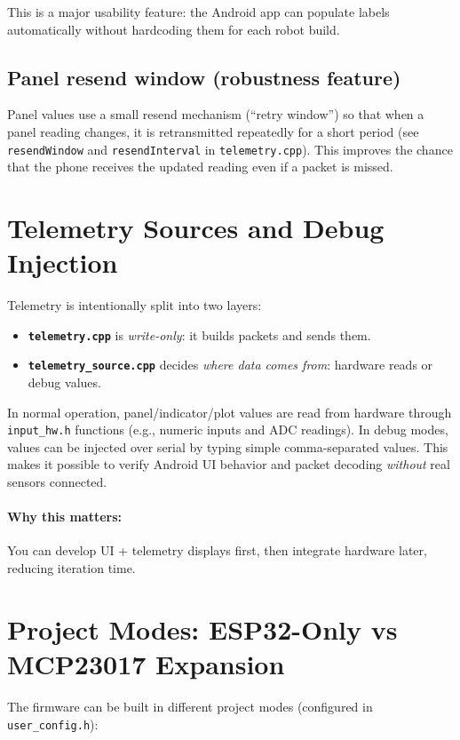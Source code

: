 This is a major usability feature: the Android app can populate labels automatically without
hardcoding them for each robot build.

\subsection{Panel resend window (robustness feature)}
Panel values use a small resend mechanism (``retry window'') so that when a panel reading changes, it is
retransmitted repeatedly for a short period (see \texttt{resendWindow} and \texttt{resendInterval} in
\texttt{telemetry.cpp}). This improves the chance that the phone receives the updated reading even if a
packet is missed.

\section{Telemetry Sources and Debug Injection}
\label{sec:telemetry-sources}

Telemetry is intentionally split into two layers:

\begin{itemize}
    \item \textbf{\texttt{telemetry.cpp}} is \emph{write-only}: it builds packets and sends them.
    \item \textbf{\texttt{telemetry\_source.cpp}} decides \emph{where data comes from}: hardware reads or debug values.
\end{itemize}

In normal operation, panel/indicator/plot values are read from hardware through \texttt{input\_hw.h}
functions (e.g., numeric inputs and ADC readings). In debug modes, values can be injected over serial
by typing simple comma-separated values. This makes it possible to verify Android UI behavior and packet
decoding \emph{without} real sensors connected.

\paragraph{Why this matters:}
You can develop UI + telemetry displays first, then integrate hardware later, reducing iteration time.

\section{Project Modes: ESP32-Only vs MCP23017 Expansion}
\label{sec:project-modes}

The firmware can be built in different project modes (configured in \texttt{user\_config.h}):

